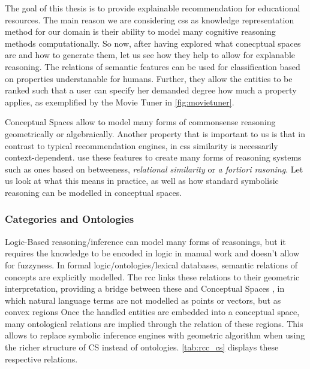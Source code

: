 
The goal of this thesis is to provide explainable recommendation for educational resources. The main reason we are considering \glspl{cs} as knowledge representation method for our domain is their ability to model many cognitive reasoning methods computationally. So now, after having explored what conecptual spaces are  and how to generate them, let us see how they help to allow for explanable reasoning. The relations of semantic features can be used for classification based on properties understanable for humans. Further, they allow the entities to be ranked such that a user can specify her demanded degree how much a property applies, as exemplified by the Movie Tuner in \autoref{fig:movietuner}. 

Conceptual Spaces allow to model many forms of commonsense reasoning geometrically or algebraically. Another property that is important to us is that in contrast to typical recommendation engines, in \glspl{cs} similarity is necessarily context-dependent. \textcite{Derrac2015} use these features to create many forms of reasoning systems such as ones based on betweeness, \textit{relational similarity} or \textit{a fortiori rasoning}. Let us look at what this means in practice, as well as how standard symbolisic reasoning can be modelled in conceptual spaces.



\subsubsection*{Categories and Ontologies}
\label{sec:ontology_rcc}

Logic-Based reasoning/inference can model many forms of reasonings, but it requires the knowledge to be encoded in logic in manual work and doesn't allow for fuzzyness.
In formal logic/ontologies/lexical databases, semantic relations of concepts are explicitly modelled. The \gls{rcc} \cite{Cohn1997a} links these relations to their geometric interpretation, providing a bridge between these and Conceptual Spaces \cite{Gardenfors2001}, in which natural language terms are not modelled as points or vectors, but as convex regions Once the handled entities are embedded into a conceptual space, many ontological relations are implied through the relation of these regions. This allows to replace symbolic inference engines with geometric algorithm when using the richer structure of CS instead of ontologies. \autoref{tab:rcc_cs} displays these respective relations.

